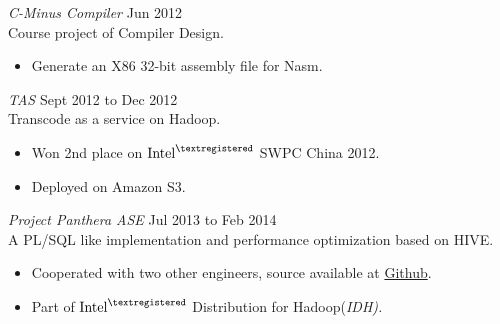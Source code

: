 \documentclass[line,margin]{res}
\begin{document}
\begin{resume}



                {\sl C-Minus Compiler} \hfill        Jun 2012 \\
                Course project of Compiler Design.
                \begin{itemize}
                   \item Generate an X86 32-bit assembly file for Nasm.
                   \end{itemize}
                
                {\sl TAS} \hfill        Sept 2012 to Dec 2012\\
                Transcode as a service on Hadoop.
                  \begin{itemize}
                   \item Won 2nd place on $\textrm{Intel}^{\textregistered}$ SWPC China 2012.
                   \item Deployed on Amazon S3.
                   \end{itemize}
                   
                {\sl Project Panthera ASE} \hfill        Jul 2013 to Feb 2014\\
                A PL/SQL like implementation and performance optimization based on HIVE.
                  \begin{itemize}
                   \item Cooperated with two other engineers, source available at \href{https://github.com/intel-hadoop/project-panthera}{Github}.
                   \item Part of $\textrm{Intel}^{\textregistered}$ Distribution for Hadoop(\sl IDH).
                   \end{itemize}

\end{resume}
\end{document}
